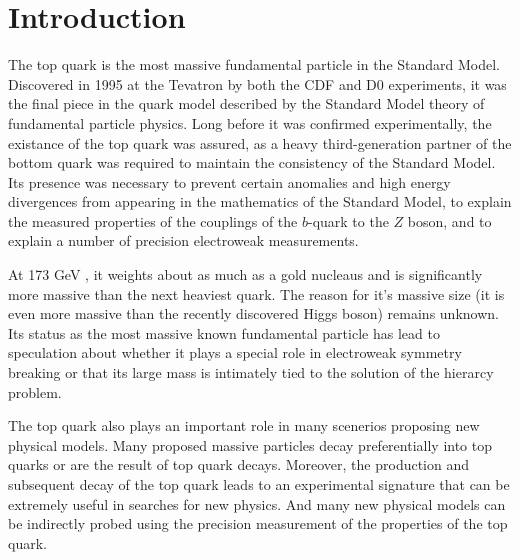 
\chapter{Introduction}

%




The top quark is the most massive fundamental particle in the Standard Model.
Discovered in 1995 at the Tevatron by both the CDF and D0 experiments, it was the final piece in the quark model described by the Standard Model theory of fundamental particle physics.
Long before it was confirmed experimentally, the existance of the top quark was assured,
as a heavy third-generation partner of the bottom quark was required to maintain the consistency of the Standard Model.%
Its presence was necessary to prevent certain anomalies and high energy divergences from appearing in the mathematics of the Standard Model,
to explain the measured properties of the couplings of the $b$-quark to the $Z$ boson, and to explain a number of precision electroweak measurements.

At 173 GeV \cite{PARTICLE_DATA_GROUP}, it weights about as much as a gold nucleaus and is significantly more massive than the next heaviest quark.
The reason for it's massive size (it is even more massive than the recently discovered Higgs boson) remains unknown.
Its status as the most massive known fundamental particle has lead to speculation about whether it plays a special role in electroweak symmetry breaking
or that its large mass is intimately tied to the solution of the hierarcy problem.

The top quark also plays an important role in many scenerios proposing new physical models.
Many proposed massive particles decay preferentially into top quarks or are the result of top quark decays.
Moreover, the production and subsequent decay of the top quark leads to an experimental signature that can be extremely useful in searches for new physics.
And many new physical models can be indirectly probed using the precision measurement of the properties of the top quark.


